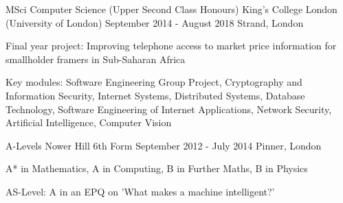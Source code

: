 

\begin{cventries}

  \cventry
    {MSci Computer Science \color{black}(Upper Second Class Honours)} %
    {King's College London (University of London)} %
    {September 2014 - August 2018} %
    {Strand, London} %
    {
      \begin{cvitems} %
        \item {Final year project: Improving telephone access to market price information for smallholder framers in Sub-Saharan Africa}
        \item {Key modules: Software Engineering Group Project, Cryptography and Information Security, Internet Systems, Distributed Systems, Database Technology, Software Engineering of Internet Applications, Network Security, Artificial Intelligence, Computer Vision}
      \end{cvitems}
    }

  \cventry
    {A-Levels} %
    {Nower Hill 6th Form} %
    {September 2012 - July 2014} %
    {Pinner, London} %
    {
      \begin{cvitems} %
        \item {A* in Mathematics, A in Computing, B in Further Maths, B in Physics}
        \item {AS-Level: A in an EPQ on 'What makes a machine intelligent?'}
      \end{cvitems}
    }

%
\end{cventries}
